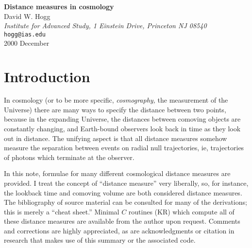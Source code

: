 

\newcommand{\simg}{\raisebox{-0.7ex}{\mbox{$\stackrel{\textstyle >}{\sim}$}}}
\newcommand{\siml}{\raisebox{-0.7ex}{\mbox{$\stackrel{\textstyle <}{\sim}$}}}
\newcommand{\bm}[1]{\mbox{\boldmath $#1$}}
\newenvironment{references}
	{\section{References}\begin{list}{}{
		\topsep=0in
		\partopsep=0in
		\itemsep=0in
		\parsep=0in
		\rightmargin=0in
		\leftmargin=3ex
		\itemindent=-1.0\leftmargin
		\labelsep=0in
		\labelwidth=0in}}
	{\end{list}}



\begin{center}
{\LARGE\bf Distance measures in cosmology} \\[1.0\baselineskip]
{\large\sc David W. Hogg} \\[0.5\baselineskip]
{\normalsize\sl Institute for Advanced Study, 1 Einstein Drive,
   Princeton NJ 08540} \\
{\normalsize\tt hogg@ias.edu} \\[0.5\baselineskip]
{2000 December}
\end{center}

\section{Introduction}

In cosmology (or to be more specific, {\em cosmography,\/} the
measurement of the Universe) there are many ways to specify the
distance between two points, because in the expanding Universe, the
distances between comoving objects are constantly changing, and
Earth-bound observers look back in time as they look out in distance.
The unifying aspect is that all distance measures somehow measure the
separation between events on radial null trajectories, ie,
trajectories of photons which terminate at the observer.

In this note, formulae for many different cosmological distance
measures are provided.  I treat the concept of ``distance measure''
very liberally, so, for instance, the lookback time and comoving
volume are both considered distance measures.  The bibliography of
source material can be consulted for many of the derivations; this is
merely a ``cheat sheet.''  Minimal $C$ routines (KR) which compute all
of these distance measures are available from the author upon request.
Comments and corrections are highly appreciated, as are
acknowledgments or citation in research that makes use of this summary
or the associated code.


